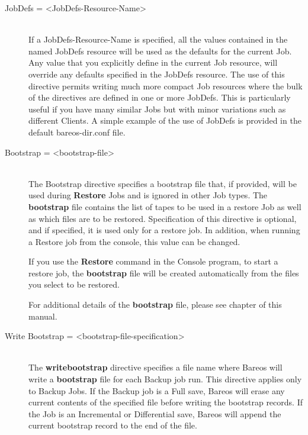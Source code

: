 \begin{description}
\item [JobDefs = {\textless}JobDefs-Resource-Name{\textgreater}] \hfill \\
If a JobDefs-Resource-Name is specified, all the values contained in the
named JobDefs resource will be used as the defaults for the current Job.
Any value that you explicitly define in the current Job resource, will
override any defaults specified in the JobDefs resource.  The use of
this directive permits writing much more compact Job resources where the
bulk of the directives are defined in one or more JobDefs.  This is
particularly useful if you have many similar Jobs but with minor
variations such as different Clients.  A simple example of the use of
JobDefs is provided in the default bareos-dir.conf file.

\item [Bootstrap = {\textless}bootstrap-file{\textgreater}] \hfill \\
The Bootstrap directive specifies a bootstrap file that, if provided,
will be used during {\bf Restore} Jobs and is ignored in other Job
types.  The {\bf bootstrap} file contains the list of tapes to be used
in a restore Job as well as which files are to be restored.
Specification of this directive is optional, and if specified, it is
used only for a restore job.  In addition, when running a Restore job
from the console, this value can be changed.

If you use the {\bf Restore} command in the Console program, to start a
restore job, the {\bf bootstrap} file will be created automatically from
the files you select to be restored.

For additional details of the {\bf bootstrap} file, please see
 chapter
of this manual.

\label{writebootstrap}
\item [Write Bootstrap =  {\textless}bootstrap-file-specification{\textgreater}] \hfill \\
The {\bf writebootstrap} directive specifies a file name where Bareos
will write a {\bf bootstrap} file for each Backup job run.  This
directive applies only to Backup Jobs.  If the Backup job is a Full
save, Bareos will erase any current contents of the specified file
before writing the bootstrap records.  If the Job is an Incremental
or Differential
save, Bareos will append the current bootstrap record to the end of the
file.


\end{description}
